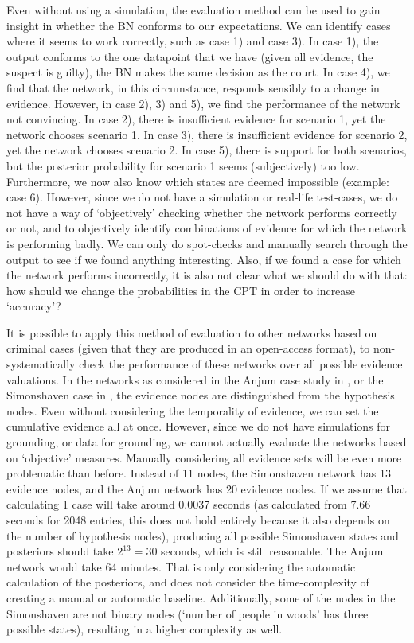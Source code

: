 \documentclass[12pt]{article}
\begin{document}
Even without using a simulation, the evaluation method can be used to gain insight in whether the BN conforms to our expectations. We can identify cases where it seems to work correctly, such as case 1) and case 3). In case 1), the output conforms to the one datapoint that we have (given all evidence, the suspect is guilty), the BN makes the same decision as the court. In case 4), we find that the network, in this circumstance, responds sensibly to a change in evidence. However, in case 2), 3) and 5), we find the performance of the network not convincing. In case 2), there is insufficient evidence for scenario 1, yet the network chooses scenario 1. In case 3), there is insufficient evidence for scenario 2, yet the network chooses scenario 2. In case 5), there is support for both scenarios, but the posterior probability for scenario 1 seems (subjectively) too low. Furthermore, we now also know which states are deemed impossible (example: case 6). However, since we do not have a simulation or real-life test-cases, we do not have a way of `objectively' checking whether the network performs correctly or not, and to objectively identify combinations of evidence for which the network is performing badly. We can only do spot-checks and manually search through the output to see if we found anything interesting. Also, if we found a case for which the network performs incorrectly, it is also not clear what we should do with that: how should we change the probabilities in the CPT in order to increase `accuracy'?

It is possible to apply this method of evaluation to other networks based on criminal cases (given that they are produced in an open-access format), to non-systematically check the performance of these networks over all possible evidence valuations. In the networks as considered in the Anjum case study in \citet{vlek2016}, or the Simonshaven case in \citet{Fenton2019}, the evidence nodes are distinguished from the hypothesis nodes. Even without considering the temporality of evidence, we can set the cumulative evidence all at once. However, since we do not have simulations for grounding, or data for grounding, we cannot actually evaluate the networks based on `objective' measures. Manually considering all evidence sets will be even more problematic than before. Instead of 11 nodes, the Simonshaven network has 13 evidence nodes, and the Anjum network has 20 evidence nodes. If we assume that calculating 1 case will take around 0.0037 seconds (as calculated from 7.66 seconds for 2048 entries, this does not hold entirely because it also depends on the number of hypothesis nodes), producing all possible Simonshaven states and posteriors should take $2^{13} = 30$ seconds, which is still reasonable. The Anjum network would take 64 minutes. That is only considering the automatic calculation of the posteriors, and does not consider the time-complexity of creating a manual or automatic baseline. Additionally, some of the nodes in the Simonshaven are not binary nodes (`number of people in woods' has three possible states), resulting in a higher complexity as well. 
\end{document}
